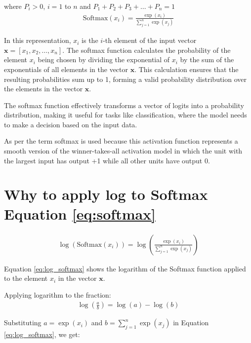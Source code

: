 where \(P_i > 0\), \(i=1\) to \(n\) and \(P_1 + P_2 + P_3 + \ldots + P_n = 1\) \\


\begin{align}
    \text{Softmax}(x_i) = \frac{{\exp(x_i)}}{{\sum_{j=1}^n \exp(x_j)}} \label{eq:softmax}
\end{align}


In this representation, \(x_i\) is the \(i\)-th element of the input vector \(\mathbf{x} = [x_1, x_2, \ldots, x_n]\). The softmax function calculates the probability of the element \(x_i\) being chosen by dividing the exponential of \(x_i\) by the sum of the exponentials of all elements in the vector \(\mathbf{x}\). This calculation ensures that the resulting probabilities sum up to 1, forming a valid probability distribution over the elements in the vector \(\mathbf{x}\).

The softmax function effectively transforms a vector of logits into a probability distribution, making it useful for tasks like classification, where the model needs to make a decision based on the input data.

As per \parencite{Book-Bishop-Neural} the term softmax is used because this activation function represents a smooth version of the winner-takes-all activation model in which the unit with the largest input has output +1 while all other units have output 0.

\clearpage

\section{Why to apply log to Softmax Equation \eqref{eq:softmax} }

 

\begin{align}
    \log(\text{Softmax}(x_i)) = \log\left(\frac{{\exp(x_i)}}{{\sum_{j=1}^n \exp(x_j)}}\right) \label{eq:log_softmax}
\end{align}

Equation \eqref{eq:log_softmax} shows the logarithm of the Softmax function applied to the element \(x_i\) in the vector \(\mathbf{x}\). 

Applying logarithm to the fraction: 
\begin{align}
    \log\left(\frac{a}{b}\right) = \log(a) - \log(b)
\end{align}

Substituting \(a = \exp(x_i)\) and \(b = \sum_{j=1}^n \exp(x_j)\) in Equation \eqref{eq:log_softmax}, we get:

